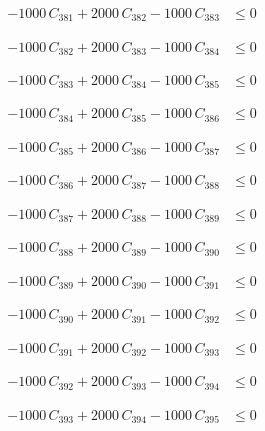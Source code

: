 \documentclass[a4paper,11pt]{article}
\begin{document}
\begin{align}
-1000\,C_{381} + 2000\,C_{382} - 1000\,C_{383} &\leq 0 \nonumber
\end{align}

\begin{align}
-1000\,C_{382} + 2000\,C_{383} - 1000\,C_{384} &\leq 0 \nonumber
\end{align}

\begin{align}
-1000\,C_{383} + 2000\,C_{384} - 1000\,C_{385} &\leq 0 \nonumber
\end{align}

\begin{align}
-1000\,C_{384} + 2000\,C_{385} - 1000\,C_{386} &\leq 0 \nonumber
\end{align}

\begin{align}
-1000\,C_{385} + 2000\,C_{386} - 1000\,C_{387} &\leq 0 \nonumber
\end{align}

\begin{align}
-1000\,C_{386} + 2000\,C_{387} - 1000\,C_{388} &\leq 0 \nonumber
\end{align}

\begin{align}
-1000\,C_{387} + 2000\,C_{388} - 1000\,C_{389} &\leq 0 \nonumber
\end{align}

\begin{align}
-1000\,C_{388} + 2000\,C_{389} - 1000\,C_{390} &\leq 0 \nonumber
\end{align}

\begin{align}
-1000\,C_{389} + 2000\,C_{390} - 1000\,C_{391} &\leq 0 \nonumber
\end{align}

\begin{align}
-1000\,C_{390} + 2000\,C_{391} - 1000\,C_{392} &\leq 0 \nonumber
\end{align}

\begin{align}
-1000\,C_{391} + 2000\,C_{392} - 1000\,C_{393} &\leq 0 \nonumber
\end{align}

\begin{align}
-1000\,C_{392} + 2000\,C_{393} - 1000\,C_{394} &\leq 0 \nonumber
\end{align}

\begin{align}
-1000\,C_{393} + 2000\,C_{394} - 1000\,C_{395} &\leq 0 \nonumber
\end{align}
\end{document}
